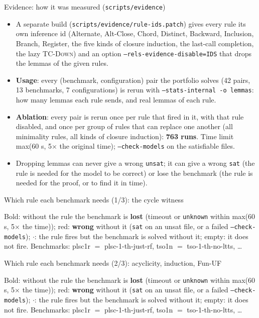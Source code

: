 \documentclass[aspectratio=169]{beamer}
\newcommand{\sm}[1]{\texttt{#1}}
\newcommand{\rn}[1]{\textsc{#1}}
\newcommand{\bad}[1]{\textcolor{red!70!black}{#1}}
\begin{document}
\begin{frame}{Evidence: how it was measured (\sm{scripts/evidence})}
  \small
  \begin{itemize}
    \item A separate build (\sm{scripts/evidence/rule-ids.patch}) gives every rule its own
      inference id (Alternate, Alt-Close, Chord, Distinct, Backward, Inclusion, Branch, Register,
      the five kinds of closure induction, the last-call completion, the lazy \rn{TC-Down}) and an
      option \sm{--rels-evidence-disable=IDS} that drops the lemmas of the given rules.
    \item \textbf{Usage}: every (benchmark, configuration) pair the portfolio solves (42 pairs, 13
      benchmarks, 7 configurations) is rerun with \sm{--stats-internal -o lemmas}: how many
      lemmas each rule sends, and real lemmas of each rule.
    \item \textbf{Ablation}: every pair is rerun once per rule that fired in it, with that rule
      disabled, and once per group of rules that can replace one another (all minimality rules,
      all kinds of closure induction): \textbf{763 runs}. Time limit max(60 s, 5$\times$ the
      original time); \sm{--check-models} on the satisfiable files.
    \item Dropping lemmas can never give a wrong \sm{unsat}; it can give a wrong \sm{sat} (the
      rule is needed for the model to be correct) or lose the benchmark (the rule is needed for
      the proof, or to find it in time).
  \end{itemize}
\end{frame}

\begin{frame}{Which rule each benchmark needs (1/3): the cycle witness}
  \centering\tiny\setlength{\tabcolsep}{2pt}
  
  \medskip

  {\scriptsize Bold: without the rule the benchmark is \textbf{lost} (timeout or \sm{unknown} within
  max(60 s, 5$\times$ the time)); \bad{red}: \textbf{wrong} without it (\sm{sat} on an unsat file, or
  a failed \sm{--check-models}); $\cdot$: the rule fires but the benchmark is solved without it;
  empty: it does not fire. Benchmarks: plsc1r $=$ plsc-1-th-just-rf, tso1n $=$ tso-1-th-no-ltts, \dots\par}
\end{frame}

\begin{frame}{Which rule each benchmark needs (2/3): acyclicity, induction, Fun-UF}
  \centering\tiny\setlength{\tabcolsep}{2pt}
  
  \medskip

  {\scriptsize Bold: without the rule the benchmark is \textbf{lost} (timeout or \sm{unknown} within
  max(60 s, 5$\times$ the time)); \bad{red}: \textbf{wrong} without it (\sm{sat} on an unsat file, or
  a failed \sm{--check-models}); $\cdot$: the rule fires but the benchmark is solved without it;
  empty: it does not fire. Benchmarks: plsc1r $=$ plsc-1-th-just-rf, tso1n $=$ tso-1-th-no-ltts, \dots\par}
\end{frame}
\end{document}
